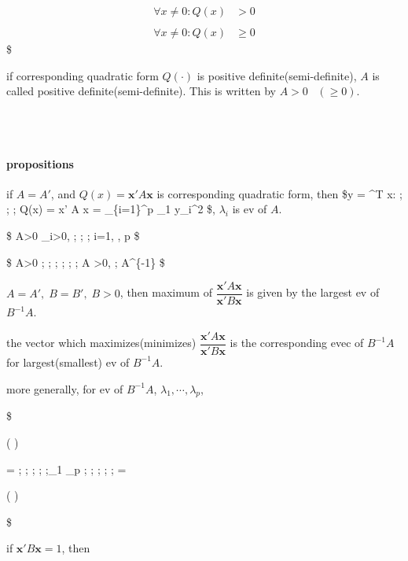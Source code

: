 \documentclass[
]{book}
\begin{document}
{{{\begin{align}
\forall x \not = 0: Q(x) &> 0 \tag{positive definite} \\

\\



\forall x \not = 0: Q(x) &\ge 0 \tag{positive semi-definite}



\end{align}
\$

if corresponding quadratic form \(Q(\cdot)\) is positive definite(semi-definite), \(A\) is called positive definite(semi-definite). This is written by \(A>0 \; \; \; (\ge 0)\).

~\\
~\\

\hypertarget{propositions}{%
\paragraph{propositions}\label{propositions}}

if \(A=A'\), and \(Q(x) = \pmb x ' A \pmb x\) is corresponding quadratic form, then \$\exists \pmb y = \Lambda\^{}T \pmb x: ; ; ; Q(x) = \pmb x' A \pmb x = \sum\_\{i=1\}\^{}p \lambda\_1 y\_i\^{}2 \$, \(\lambda_i\) is ev of \(A\).

\$
A\textgreater0 \iff \forall \lambda\_i\textgreater0, ; ; ; i=1, \cdots, p
\$

\$
A\textgreater0 ; ; ; \Longrightarrow ; ; ; \vert A \vert \textgreater0, ; \exists A\^{}\{-1\}
\$

\(A=A', \; B=B', \; B>0\), then maximum of \(\dfrac{\pmb x ' A \pmb x}{\pmb x ' B \pmb x}\) is given by the largest ev of \(B^{-1}A\).

the vector which maximizes(minimizes) \(\dfrac{\pmb x ' A \pmb x}{\pmb x ' B \pmb x}\) is the corresponding evec of \(B^{-1}A\) for largest(smallest) ev of \(B^{-1}A\).

more generally, for ev of \(B^{-1}A\), \(\lambda_1, \cdots, \lambda_p\),

\$

\max \left(  \right)

= ; ; ; ; ;\lambda\_1 \ge \cdots \ge \lambda\_p ; ; ; ; ; =

\min \left(  \right)

\$

if \({\pmb x ' B \pmb x}=1\), then

}}}
\end{document}

